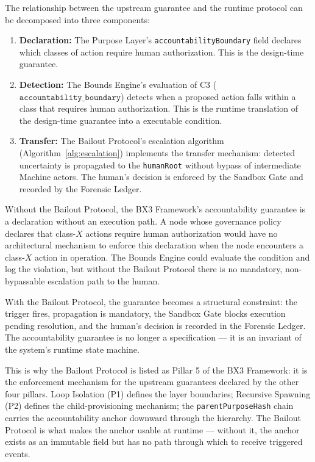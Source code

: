The relationship between the upstream guarantee and the runtime protocol can be decomposed into three components:

\begin{enumerate}
  \item \textbf{Declaration:} The Purpose Layer's \texttt{accountabilityBoundary} field declares which classes of action require human authorization. This is the design-time guarantee.

  \item \textbf{Detection:} The Bounds Engine's evaluation of C3 ($\texttt{accountability\_boundary}$) detects when a proposed action falls within a class that requires human authorization. This is the runtime translation of the design-time guarantee into a executable condition.

  \item \textbf{Transfer:} The Bailout Protocol's escalation algorithm (Algorithm~\ref{alg:escalation}) implements the transfer mechanism: detected uncertainty is propagated to the \texttt{humanRoot} without bypass of intermediate Machine actors. The human's decision is enforced by the Sandbox Gate and recorded by the Forensic Ledger.
\end{enumerate}

Without the Bailout Protocol, the BX3 Framework's accountability guarantee is a declaration without an execution path. A node whose governance policy declares that class-$X$ actions require human authorization would have no architectural mechanism to enforce this declaration when the node encounters a class-$X$ action in operation. The Bounds Engine could evaluate the condition and log the violation, but without the Bailout Protocol there is no mandatory, non-bypassable escalation path to the human.

With the Bailout Protocol, the guarantee becomes a structural constraint: the trigger fires, propagation is mandatory, the Sandbox Gate blocks execution pending resolution, and the human's decision is recorded in the Forensic Ledger. The accountability guarantee is no longer a specification --- it is an invariant of the system's runtime state machine.

This is why the Bailout Protocol is listed as Pillar 5 of the BX3 Framework: it is the enforcement mechanism for the upstream guarantees declared by the other four pillars. Loop Isolation (P1) defines the layer boundaries; Recursive Spawning (P2) defines the child-provisioning mechanism; the \texttt{parentPurposeHash} chain carries the accountability anchor downward through the hierarchy. The Bailout Protocol is what makes the anchor usable at runtime --- without it, the anchor exists as an immutable field but has no path through which to receive triggered events.

